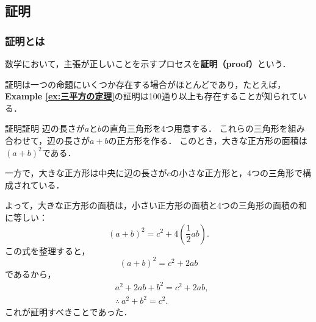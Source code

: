 \documentclass[a4paper,11pt]{ltjsarticle}
\renewcommand{\emph}[1]{\textbf{#1}}
\newcommand{\exref}[1]{{\bfseries\sffamily Example \ref{ex:#1}}}
\begin{document}
    \subsection{証明}

    \subsubsection{証明とは}
    数学において，主張が正しいことを示すプロセスを\emph{証明（proof）}という．
    
    証明は一つの命題にいくつか存在する場合がほとんどであり，たとえば，\exref{三平方の定理}の証明は100通り以上も存在することが知られている．
    
    \begin{example}{証明}{証明}
    辺の長さが$a$と$b$の直角三角形を$4$つ用意する．
    これらの三角形を組み合わせて，辺の長さが$a + b$の正方形を作る．
    このとき，大きな正方形の面積は$(a + b)^2$である．
    
    一方で，大きな正方形は中央に辺の長さが$c$の小さな正方形と，$4$つの三角形で構成されている．
    
    よって，大きな正方形の面積は，小さい正方形の面積と4つの三角形の面積の和に等しい：
    \[
    (a + b)^2 = c^2 + 4 \left( \frac{1}{2}ab \right).
    \]
    この式を整理すると，
    \[
     (a + b)^2 = c^2 + 2ab
    \]
    であるから，
    \begin{align*}
    & a^2 + 2ab + b^2 = c^2 + 2ab, \\
    & \therefore ~a^2 + b^2 = c^2.
    \end{align*}
    これが証明すべきことであった．\qedhere 
    \begin{center}
\end{center}
\end{example}
\end{document}
